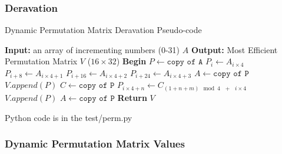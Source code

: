 \documentclass[fleqn, a4paper,12pt]{article}
\begin{document}
\subsubsection{Deravation}

\begin{algorithm}[H] %
\caption{Dynamic Permutation Matrix Deravation Pseudo-code}
\begin{algorithmic}[1]  %
\State \textbf{Input:} an array of incrementing numbers (0-31) $A$ 
\State \textbf{Output:} Most Efficient Permutation Matrix $V$ ($16 \times 32$)
\State \textbf{Begin}
\State $P \gets \texttt{copy of A}$
		\State $P_i      \gets A_{i \times 4}$
		\State $P_{i+8}  \gets A_{i \times 4 + 1}$
		\State $P_{i+16} \gets A_{i \times 4 + 2}$
		\State $P_{i+24} \gets A_{i \times 4 + 3}$
	\EndFor
	\State $A \gets \texttt{copy of P}$
	\State $V.append(P)$
	\State $C \gets \texttt{copy of P}$
			\State $P_{i \times 4 + n} \gets C_{(1+n+m) \mod{4} \texttt{    } + \texttt{    } i \times 4}$
			\EndFor
		\EndFor
		\State $V.append(P)$
	\EndFor
	\State $A \gets \texttt{copy of P}$
\EndFor
\State \textbf{Return} $V$
\end{algorithmic}
\end{algorithm}

Python code is in the test/perm.py
 
\subsubsection{Dynamic Permutation Matrix Values} %

\renewcommand{\arraystretch}{1} %
\end{document}
